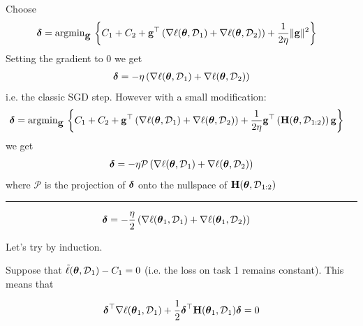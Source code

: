 \documentclass{article} %
\newcommand{\hessian}{\vH}
\newcommand{\lighthline}{\noindent\textcolor{gray!50}{\rule{\linewidth}{0.4pt}}}
\begin{document}
Choose 
\begin{align}
    \mbox{$\mbox{$\boldsymbol{\delta}$}$} 
    & = \operatorname{argmin}_{\mbox{$\mbox{$\mathbf{g}$}$}} \,\left\{ C_1 + C_2 + \mbox{$\mbox{$\mathbf{g}$}$}^\top\left(\nabla\ell(\mbox{$\mbox{$\boldsymbol{\theta}$}$}, \mbox{${\cal D}$}_{1}) + \nabla\ell(\mbox{$\mbox{$\boldsymbol{\theta}$}$}, \mbox{${\cal D}$}_{2})\right)  + \frac{1}{2\eta}\|\mbox{$\mbox{$\mathbf{g}$}$}\|^2\right\}
\end{align}
Setting the gradient to $0$ we get
\begin{align}
    \mbox{$\mbox{$\boldsymbol{\delta}$}$} = -\eta\left(\nabla\ell(\mbox{$\mbox{$\boldsymbol{\theta}$}$}, \mbox{${\cal D}$}_{1}) + \nabla\ell(\mbox{$\mbox{$\boldsymbol{\theta}$}$}, \mbox{${\cal D}$}_{2})\right)
\end{align}
i.e. the classic SGD step. 
However with a small modification: 
\begin{align}
    \vdelta 
    & = \operatorname{argmin}_{\vg} \,\left\{ C_1 + C_2 + \vg^\top\rnd{\nabla\loss(\vparam, \data_{1}) + \nabla\loss(\vparam, \data_{2})}  + \frac{1}{2\eta}\vg^\top \rnd{\hessian(\vparam, \data_{1:2})} \vg\right\}
\end{align}
we get 
\begin{align}
    \mbox{$\mbox{$\boldsymbol{\delta}$}$} = -\eta\mathcal{P}\left(\nabla\ell(\mbox{$\mbox{$\boldsymbol{\theta}$}$}, \mbox{${\cal D}$}_{1}) + \nabla\ell(\mbox{$\mbox{$\boldsymbol{\theta}$}$}, \mbox{${\cal D}$}_{2})\right)
\end{align}
where $\mathcal{P}$ is the projection of $\mbox{$\mbox{$\boldsymbol{\delta}$}$}$ onto the nullspace of $\hessian(\vparam, \data_{1:2})$


\lighthline
\begin{align}
    \mbox{$\mbox{$\boldsymbol{\delta}$}$} 
    & = -\frac{\eta}{2}\left({\nabla\ell(\mbox{$\mbox{$\boldsymbol{\theta}$}$}_1,\mbox{${\cal D}$}_1)} + \nabla\ell(\mbox{$\mbox{$\boldsymbol{\theta}$}$}_1,\mbox{${\cal D}$}_2)\right)
\end{align}





Let's try by induction. 

Suppose that $\tilde{\ell}(\mbox{$\mbox{$\boldsymbol{\theta}$}$}, \mbox{${\cal D}$}_{1}) -  C_1 =0$ (i.e. the loss on task 1 remains constant). This means that 

\begin{align}
    \vdelta^\top{\nabla\loss}(\vparam_1, \data_{1}) + \frac{1}{2}\vdelta^\top\hessian(\vparam_1, \data_{1})\vdelta = 0
\end{align}
\end{document}
